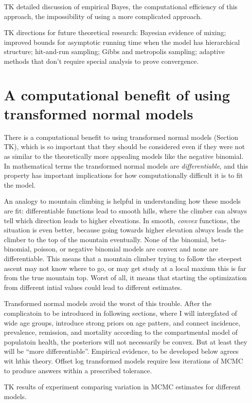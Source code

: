 TK detailed discussion of empirical Bayes, the computational
efficiency of this approach, the impossibility of using a more
complicated approach.

TK directions for future theoretical research: Bayesian evidence of
mixing; improved bounds for asymptotic running time when the model has
hierarchical structure; hit-and-run sampling; Gibbs and metropolis
sampling; adaptive methods that don't require special analysis to
prove convergence.



\section{A computational benefit of using transformed normal models}

There is a computational benefit to using transformed normal models
(Section TK), which is so important that they should be considered
even if they were not as similar to the theoretically more appealing
models like the negative binomial.  In mathematical terms the
transformed normal models are \emph{differentiable}, and this property
has important implications for how computationally difficult it is to
fit the model.

An analogy to mountain climbing is helpful in understanding how these
models are fit: differentiable functions lead to smooth hills, where
the climber can always tell which direction leads to higher
elveations.  In smooth, \emph{convex} functions, the situation is even
better, because going towards higher elevation always leads the
climber to the top of the mountain eventually.  None of the binomial,
beta-binomial, poisson, or negative binomial models are convex and
none are differentiable.  This means that a mountain climber trying to
follow the steepest ascent may not know where to go, or may get study
at a local maxium this is far from the true mountain top.  Worst of
all, it means that starting the optimization from different intial
values could lead to different estimates.

Transformed normal models avoid the worst of this trouble.  After the
complicatoin to be introduced in following sections, where I will
intergfated of wide age groups, introduce strong priors on age
patters, and connect incidence, prevalence, remission, and mortality
according to the compartmental model of populatoin health, the
posteriors will not necessarily be convex.  But at least they will be
``more differentiable''.  Empirical evidence, to be developed below
agrees wit hthis theory.  Offset log transformed models require less
iterations of MCMC to produce answers within a prescribed tolerance.

TK results of experiment comparing variation in MCMC estimates for
different models.
